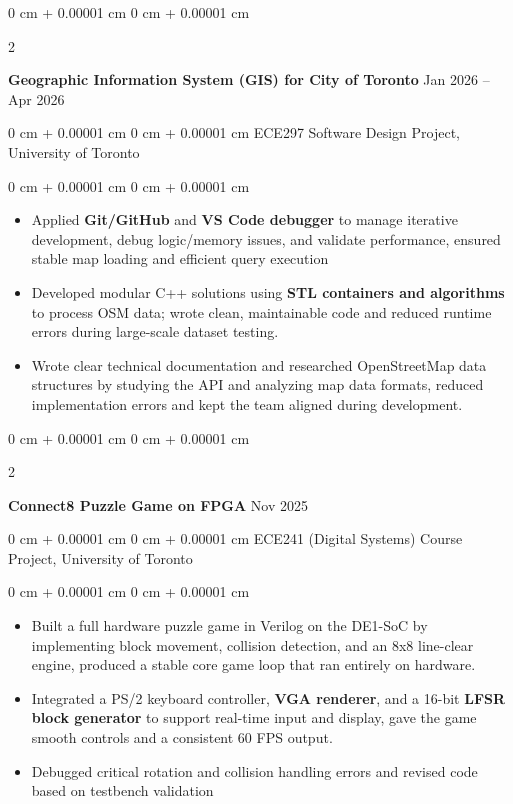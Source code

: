 \documentclass[10pt, letterpaper]{article}
\newenvironment{highlights}{
    \begin{itemize}[
        topsep=0.05 cm,
        parsep=0.05 cm,
        partopsep=0pt,
        itemsep=0pt,
        leftmargin=0 cm + 10pt
    ]
}{
    \end{itemize}
} %
\newenvironment{onecolentry}{
    \begin{adjustwidth}{
        0 cm + 0.00001 cm
    }{
        0 cm + 0.00001 cm
    }
}{
    \end{adjustwidth}
} %
\newenvironment{twocolentry}[2][]{
    \onecolentry
    \def\secondColumn{#2}
    \setcolumnwidth{\fill, 4.5 cm}
    \begin{paracol}{2}
}{
    \switchcolumn \raggedleft \secondColumn
    \end{paracol}
    \endonecolentry
} %
\begin{document}
        \vspace{0.15 cm}

         \begin{twocolentry}{Jan 2026 -- Apr 2026}
            \textbf{Geographic Information System (GIS) for City of Toronto}\end{twocolentry}
        \begin{onecolentry}{ECE297 Software Design Project, University of Toronto}\end{onecolentry}

             \vspace{0.05 cm}
            \begin{onecolentry}
                \begin{highlights}
                \item Applied \textbf{Git/GitHub} and \textbf{VS Code debugger} to manage iterative development, debug logic/memory issues, and validate performance, ensured stable map loading and efficient query execution
                \item Developed modular C++ solutions using \textbf{STL containers and algorithms} to process OSM data; wrote clean, maintainable code and reduced runtime errors during large-scale dataset testing.
                \item Wrote clear technical documentation and researched OpenStreetMap data structures by studying the API and analyzing map data formats, reduced implementation errors and kept the team aligned during development.
            \end{highlights}
        \end{onecolentry}

        \vspace{0.15 cm}
        
         \begin{twocolentry}{Nov 2025}
            \textbf{Connect8 Puzzle Game on FPGA}\end{twocolentry}
        \begin{onecolentry}{ECE241 (Digital Systems) Course Project, University of Toronto}\end{onecolentry}

             \vspace{0.05 cm}
            \begin{onecolentry}
                \begin{highlights}
                \item Built a full hardware puzzle game in Verilog on the DE1-SoC by implementing block movement, collision detection, and an 8x8 line-clear engine, produced a stable core game loop that ran entirely on hardware.
                \item Integrated a PS/2 keyboard controller, \textbf{VGA renderer}, and a 16-bit \textbf{LFSR block generator} to support real-time input and display, gave the game smooth controls and a consistent 60 FPS output.                
                \item Debugged critical rotation and collision handling errors and revised code based on testbench validation
            \end{highlights}
        \end{onecolentry}
\end{document}
